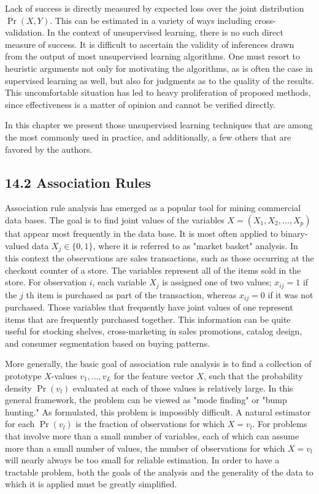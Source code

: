 \documentclass[10pt]{article}
\begin{document}
Lack of success is directly measured by expected loss over the joint distribution $\operatorname{Pr}(X, Y)$. This can be estimated in a variety of ways including cross-validation. In the context of unsupervised learning, there is no such direct measure of success. It is difficult to ascertain the validity of inferences drawn from the output of most unsupervised learning algorithms. One must resort to heuristic arguments not only for motivating the algorithms, as is often the case in supervised learning as well, but also for judgments as to the quality of the results. This uncomfortable situation has led to heavy proliferation of proposed methods, since effectiveness is a matter of opinion and cannot be verified directly.

In this chapter we present those unsupervised learning techniques that are among the most commonly used in practice, and additionally, a few others that are favored by the authors.

\subsection*{14.2 Association Rules}
Association rule analysis has emerged as a popular tool for mining commercial data bases. The goal is to find joint values of the variables $X= \left(X_{1}, X_{2}, \ldots, X_{p}\right)$ that appear most frequently in the data base. It is most often applied to binary-valued data $X_{j} \in\{0,1\}$, where it is referred to as "market basket" analysis. In this context the observations are sales transactions, such as those occurring at the checkout counter of a store. The variables represent all of the items sold in the store. For observation $i$, each variable $X_{j}$ is assigned one of two values; $x_{i j}=1$ if the $j$ th item is purchased as part of the transaction, whereas $x_{i j}=0$ if it was not purchased. Those variables that frequently have joint values of one represent items that are frequently purchased together. This information can be quite useful for stocking shelves, cross-marketing in sales promotions, catalog design, and consumer segmentation based on buying patterns.

More generally, the basic goal of association rule analysis is to find a collection of prototype $X$-values $v_{1}, \ldots, v_{L}$ for the feature vector $X$, such that the probability density $\operatorname{Pr}\left(v_{l}\right)$ evaluated at each of those values is relatively large. In this general framework, the problem can be viewed as "mode finding" or "bump hunting." As formulated, this problem is impossibly difficult. A natural estimator for each $\operatorname{Pr}\left(v_{l}\right)$ is the fraction of observations for which $X=v_{l}$. For problems that involve more than a small number of variables, each of which can assume more than a small number of values, the number of observations for which $X=v_{l}$ will nearly always be too small for reliable estimation. In order to have a tractable problem, both the goals of the analysis and the generality of the data to which it is applied must be greatly simplified.
\end{document}
